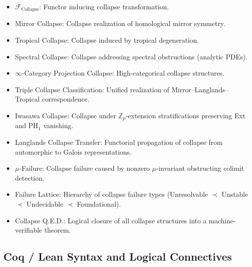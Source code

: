 \documentclass[11pt]{article}
\begin{document}
\begin{itemize}
  \item $\mathcal{F}_{\mathrm{Collapse}}$: Functor inducing collapse transformation.
  \item Mirror Collapse: Collapse realization of homological mirror symmetry.
  \item Tropical Collapse: Collapse induced by tropical degeneration.
  \item Spectral Collapse: Collapse addressing spectral obstructions (analytic PDEs).
  \item $\infty$-Category Projection Collapse: High-categorical collapse structures.
  \item Triple Collapse Classification: Unified realization of Mirror–Langlands–Tropical correspondence.
  \item Iwasawa Collapse: Collapse under $\mathbb{Z}_p$-extension stratifications preserving Ext and PH$_1$ vanishing.
  \item Langlands Collapse Transfer: Functorial propagation of collapse from automorphic to Galois representations.
  \item $\mu$-Failure: Collapse failure caused by nonzero $\mu$-invariant obstructing colimit detection.
  \item Failure Lattice: Hierarchy of collapse failure types (Unresolvable $\prec$ Unstable $\prec$ Undecidable $\prec$ Foundational).
  \item Collapse Q.E.D.: Logical closure of all collapse structures into a machine-verifiable theorem.
\end{itemize}

\subsection*{Coq / Lean Syntax and Logical Connectives}
\end{document}
